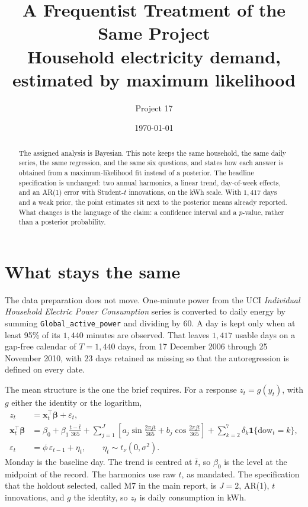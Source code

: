 \documentclass[11pt]{article}
\title{\vspace{-1.2cm}\textbf{A Frequentist Treatment of the Same Project}\\[2pt]
\large Household electricity demand, estimated by maximum likelihood}
\author{Project 17}
\date{\today}
\newcommand{\code}[1]{\texttt{\small #1}}
\begin{document}
\maketitle
\thispagestyle{fancy}

\begin{abstract}
\noindent
The assigned analysis is Bayesian. This note keeps the same household, the same
daily series, the same regression, and the same six questions, and states how
each answer is obtained from a maximum-likelihood fit instead of a posterior.
The headline specification is unchanged: two annual harmonics, a linear trend,
day-of-week effects, and an AR(1) error with Student-$t$ innovations, on the
kWh scale. With $1{,}417$ days and a weak prior, the point estimates sit next
to the posterior means already reported. What changes is the language of the
claim: a confidence interval and a $p$-value, rather than a posterior
probability.
\end{abstract}

\section{What stays the same}

The data preparation does not move. One-minute power from the UCI
\emph{Individual Household Electric Power Consumption} series is converted to
daily energy by summing \code{Global\_active\_power} and dividing by $60$. A
day is kept only when at least 95\% of its $1{,}440$ minutes are observed.
That leaves $1{,}417$ usable days on a gap-free calendar of $T = 1{,}440$
days, from 17 December 2006 through 25 November 2010, with $23$ days retained
as missing so that the autoregression is defined on every date.

The mean structure is the one the brief requires. For a response $z_t = g(y_t)$,
with $g$ either the identity or the logarithm,
\begin{align}
z_t &= \mathbf{x}_t^{\top}\boldsymbol\beta + \varepsilon_t, \label{eq:mean}\\
\mathbf{x}_t^{\top}\boldsymbol\beta
 &= \beta_0
  + \beta_1 \frac{t - \bar t}{365}
  + \sum_{j=1}^{J}\left[a_j \sin\frac{2\pi j t}{365} + b_j \cos\frac{2\pi j t}{365}\right]
  + \sum_{k=2}^{7}\delta_k \mathbf{1}\{\mathrm{dow}_t = k\}, \label{eq:design}\\
\varepsilon_t &= \phi\,\varepsilon_{t-1} + \eta_t,
\qquad
\eta_t \sim t_\nu(0,\sigma^2). \label{eq:ar}
\end{align}
Monday is the baseline day. The trend is centred at $\bar t$, so $\beta_0$ is
the level at the midpoint of the record. The harmonics use raw $t$, as
mandated. The specification that the holdout selected, called M7 in the main
report, is $J = 2$, AR(1), $t$ innovations, and $g$ the identity, so $z_t$ is
daily consumption in kWh.
\end{document}
